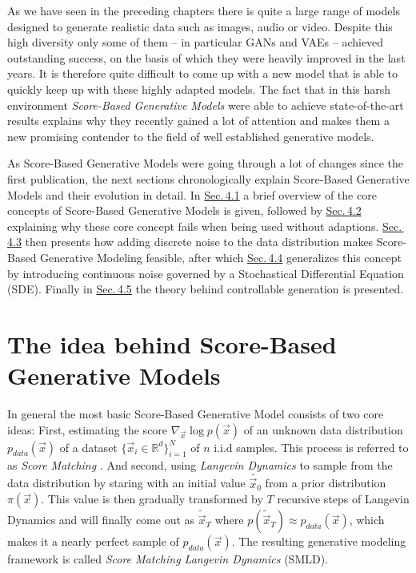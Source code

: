 As we have seen in the preceding chapters there is quite a large range of models designed to generate realistic data such as images, audio or video. Despite this high diversity only some of them – in particular GANs and VAEs – achieved outstanding success, on the basis of which they were heavily improved in the last years. It is therefore quite difficult to come up with a new model that is able to quickly keep up with these highly adapted models. The fact that in this harsh environment \textit{Score-Based Generative Models} \cite{score_1, score_3, score_2} were able to achieve state-of-the-art results explains why they recently gained a lot of attention and makes them a new promising contender to the field of well established generative models.

As Score-Based Generative Models were going through a lot of changes since the first publication, the next sections chronologically explain Score-Based Generative Models and their evolution in detail. In \hyperref[sec:4.1]{Sec.\,4.1} a brief overview of the core concepts of Score-Based Generative Models is given, followed by \hyperref[sec:4.2]{Sec.\,4.2} explaining why these core concept fails when being used without adaptions. \hyperref[sec:4.3]{Sec.\,4.3} then presents how adding discrete noise to the data distribution makes Score-Based Generative Modeling feasible, after which \hyperref[sec:4.4]{Sec.\,4.4} generalizes this concept by introducing continuous noise governed by a Stochastical Differential Equation (SDE). Finally in \hyperref[sec:4.5]{Sec.\,4.5} the theory behind controllable generation is presented.

\section{The idea behind Score-Based Generative Models} \label{sec:4.1}
In general the most basic Score-Based Generative Model consists of two core ideas: First, estimating the score $\nabla_{\vec{x}}\log p(\vec{x})$ of an unknown data distribution $p_{data}(\vec{x})$ of a dataset $\{\vec{x}_i\in \mathbb{R}^d\}_{i=1}^N$ of $n$ i.i.d samples. This process is referred to as \textit{Score Matching} \cite{score_matching_original}. And second, using \textit{Langevin Dynamics} \cite{langevin1, langevin2} to sample from the data distribution by staring with an initial value $\tilde{\vec{x}_0}$ from a prior distribution $\pi(\vec{x})$. This value is then gradually transformed by $T$ recursive steps of Langevin Dynamics and will finally come out as $\tilde{\vec{x}}_T$ where $p(\tilde{\vec{x}}_T)\approx p_{data}(\vec{x})$, which makes it a nearly perfect sample of $p_{data}(\vec{x})$. The resulting generative modeling framework is called \textit{Score Matching Langevin Dynamics} (SMLD).
%
